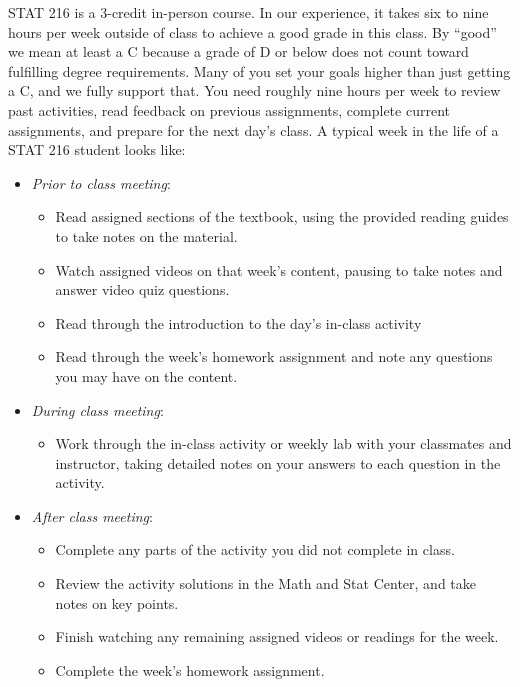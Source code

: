 \documentclass[
]{report}
\providecommand{\tightlist}{%
  \setlength{\itemsep}{0pt}\setlength{\parskip}{0pt}}
\begin{document}
STAT 216 is a 3-credit in-person course. In our experience, it takes six to nine hours per week outside of class to achieve a good grade in this class. By ``good'' we mean at least a C because a grade of D or below does not count toward fulfilling degree requirements. Many of you set your goals higher than just getting a C, and we fully support that. You need roughly nine hours per week to review past activities, read feedback on previous assignments, complete current assignments, and prepare for the next day's class. A typical week in the life of a STAT 216 student looks like:

\begin{itemize}
\tightlist
\item
  \emph{Prior to class meeting}:

  \begin{itemize}
  \tightlist
  \item
    Read assigned sections of the textbook, using the provided reading guides to take notes on the material.
  \item
    Watch assigned videos on that week's content, pausing to take notes and answer video quiz questions.
  \item
    Read through the introduction to the day's in-class activity
  \item
    Read through the week's homework assignment and note any questions you may have on the content.
  \end{itemize}
\item
  \emph{During class meeting}:

  \begin{itemize}
  \tightlist
  \item
    Work through the in-class activity or weekly lab with your classmates and instructor, taking detailed notes on your answers to each question in the activity.
  \end{itemize}
\item
  \emph{After class meeting}:

  \begin{itemize}
  \tightlist
  \item
    Complete any parts of the activity you did not complete in class.
  \item
    Review the activity solutions in the Math and Stat Center, and take notes on key points.
  \item
    Finish watching any remaining assigned videos or readings for the week.
  \item
    Complete the week's homework assignment.
  \end{itemize}
\end{itemize}
\end{document}
